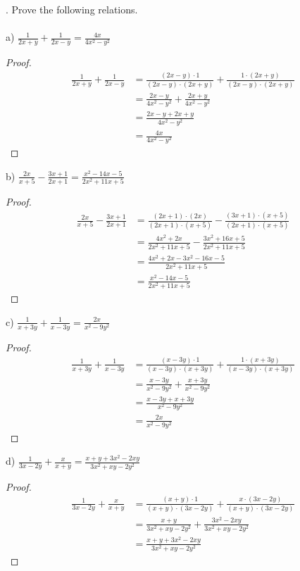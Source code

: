 \documentclass[12pt]{article}
\begin{document}
. Prove the following relations. \\
\\
a) $\displaystyle \frac{1}{2x+y}+\displaystyle \frac{1}{2x-y}=\displaystyle \frac{4x}{4x^2-y^2}$
\begin{proof}
\begin{align*}
\displaystyle \frac{1}{2x+y}+\displaystyle \frac{1}{2x-y}&=\displaystyle \frac{(2x-y)\cdot1}{(2x-y)\cdot(2x+y)}+\displaystyle \frac{1\cdot(2x+y)}{(2x-y)\cdot(2x+y)} \\
&=\displaystyle \frac{2x-y}{4x^2-y^2}+\displaystyle \frac{2x+y}{4x^2-y^2} \\
&=\displaystyle \frac{2x-y+2x+y}{4x^2-y^2} \\
&=\displaystyle \frac{4x}{4x^2-y^2}
\end{align*}
\end{proof}
\noindent b) $\displaystyle \frac{2x}{x+5}-\displaystyle \frac{3x+1}{2x+1}=\displaystyle \frac{x^2-14x-5}{2x^2+11x+5}$
\begin{proof}
\begin{align*}
\displaystyle \frac{2x}{x+5}-\displaystyle \frac{3x+1}{2x+1}&=\displaystyle \frac{(2x+1)\cdot(2x)}{(2x+1)\cdot(x+5)}-\displaystyle \frac{(3x+1)\cdot(x+5)}{(2x+1)\cdot(x+5)} \\
&=\displaystyle \frac{4x^2+2x}{2x^2+11x+5}-\displaystyle \frac{3x^2+16x+5}{2x^2+11x+5} \\
&=\displaystyle \frac{4x^2+2x-3x^2-16x-5}{2x^2+11x+5} \\
&=\displaystyle \frac{x^2-14x-5}{2x^2+11x+5}
\end{align*}
\end{proof}
\noindent c) $\displaystyle \frac{1}{x+3y}+\displaystyle \frac{1}{x-3y}=\displaystyle \frac{2x}{x^2-9y^2}$
\begin{proof}
\begin{align*}
\displaystyle \frac{1}{x+3y}+\displaystyle \frac{1}{x-3y}&=\displaystyle \frac{(x-3y)\cdot1}{(x-3y)\cdot(x+3y)}+\displaystyle \frac{1\cdot(x+3y)}{(x-3y)\cdot(x+3y)} \\
&=\displaystyle \frac{x-3y}{x^2-9y^2}+\displaystyle \frac{x+3y}{x^2-9y^2} \\
&=\displaystyle \frac{x-3y+x+3y}{x^2-9y^2} \\
&=\displaystyle \frac{2x}{x^2-9y^2}
\end{align*}
\end{proof}
\noindent d) $\displaystyle \frac{1}{3x-2y}+\displaystyle \frac{x}{x+y}=\displaystyle \frac{x+y+3x^2-2xy}{3x^2+xy-2y^2}$
\begin{proof}
\begin{align*}
\displaystyle \frac{1}{3x-2y}+\displaystyle \frac{x}{x+y}&=\displaystyle \frac{(x+y)\cdot1}{(x+y)\cdot(3x-2y)}+\displaystyle \frac{x\cdot(3x-2y)}{(x+y)\cdot(3x-2y)} \\
&=\displaystyle \frac{x+y}{3x^2+xy-2y^2}+\displaystyle \frac{3x^2-2xy}{3x^2+xy-2y^2} \\
&=\displaystyle \frac{x+y+3x^2-2xy}{3x^2+xy-2y^2}
\end{align*}
\end{proof}
\end{document}
